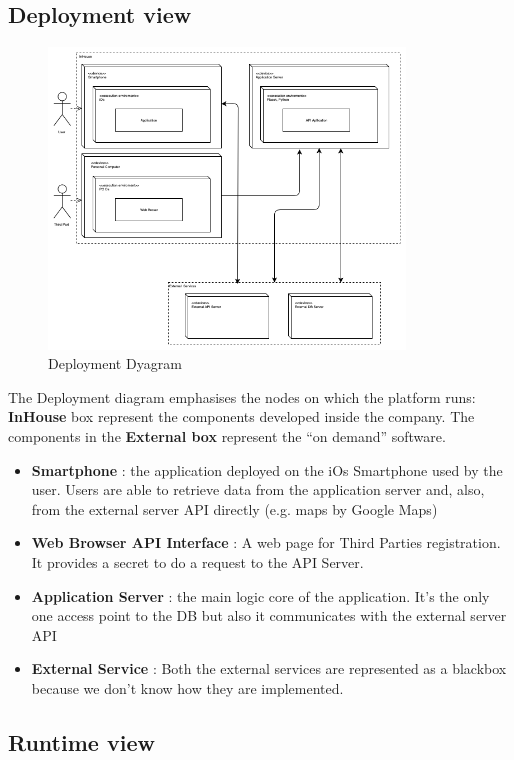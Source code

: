 \documentclass[DD.tex]{subfiles}
\begin{document}
\newpage
\subsection{Deployment view}

\begin{figure}[h!]
	\centering
	\includegraphics[height=8.00cm,keepaspectratio]{Figures/DeploymentDiagram}
	\caption{Deployment Dyagram}
\end{figure}

The Deployment diagram emphasises the nodes on which the platform runs:\\
\textbf{InHouse} box represent the components developed inside the company.
The components in the \textbf{External box} represent the “on demand” software.\\
\begin{itemize}
\item	\textbf{Smartphone} : the application deployed on the iOs Smartphone used by the user. Users are able to retrieve data from the application server and, also, from the external 			server API directly (e.g. maps by Google Maps)
\item \textbf{Web Browser API Interface} : A web page for Third Parties registration. It provides a secret to do a request to the API Server.
\item \textbf{Application Server }: the  main logic core of the application. It’s the only one access point to the DB but also it communicates with the external server API
\item  \textbf{External Service} : Both the external services are represented as a blackbox because we don’t know how they are implemented.
\end{itemize}
\newpage


\subsection{Runtime view}
\end{document}

